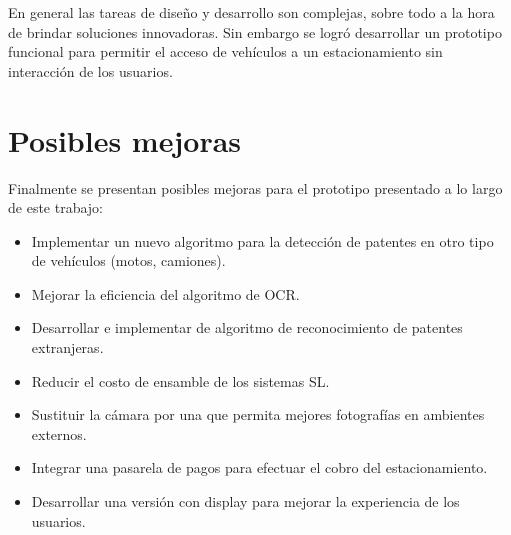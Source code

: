 En general las tareas de diseño y desarrollo son complejas, sobre todo a la hora de brindar soluciones innovadoras.
Sin embargo se logró desarrollar un prototipo funcional para permitir el acceso de vehículos a un estacionamiento sin interacción de los usuarios.

\section{Posibles mejoras}
Finalmente se presentan posibles mejoras para el prototipo presentado a lo largo de este trabajo:
\begin{itemize}
    \item Implementar un nuevo algoritmo para la detección de patentes en otro tipo de vehículos (motos, camiones).
    \item Mejorar la eficiencia del algoritmo de OCR.
    \item Desarrollar e implementar de algoritmo de reconocimiento de patentes extranjeras.
    \item Reducir el costo de ensamble de los sistemas SL.
    \item Sustituir la cámara por una que permita mejores fotografías en ambientes externos.
    \item Integrar una pasarela de pagos para efectuar el cobro del estacionamiento.
    \item Desarrollar una versión con display para mejorar la experiencia de los usuarios.
\end{itemize}

